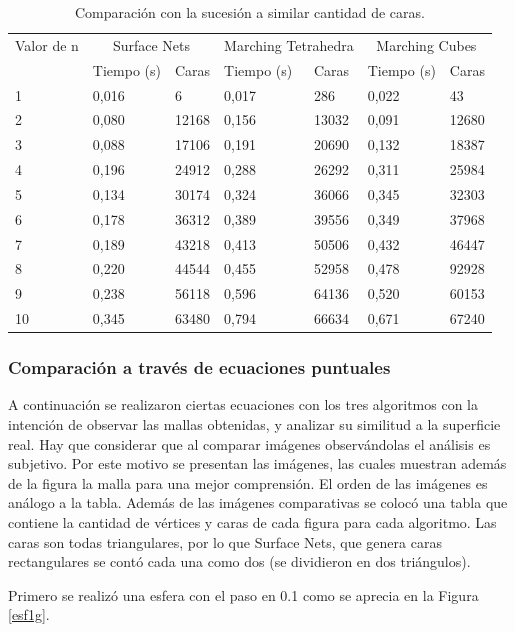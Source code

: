 \documentclass[12pt]{article}
\begin{document}
\begin{table}[h!]
  \centering
\begin{tabular}{lllllll}
\toprule 
    Valor de n & \multicolumn{2}{c}{Surface Nets} & \multicolumn{2}{c}{Marching Tetrahedra}  & \multicolumn{2}{c}{Marching Cubes}\\
    &Tiempo (s) &Caras
    &Tiempo (s) &Caras
    &Tiempo (s) &Caras \\
    \midrule
    1 & 0,016 &6 & 0,017 &286 & 0,022 &43\\
    2 & 0,080 &12168 & 0,156 &13032 & 0,091 &12680\\
    3 & 0,088 &17106 & 0,191 &20690 & 0,132 &18387\\
    4 & 0,196 &24912 & 0,288 &26292 & 0,311 &25984\\
    5 & 0,134 &30174 & 0,324 &36066 & 0,345 &32303\\
    6 & 0,178 &36312 & 0,389 &39556 & 0,349 &37968\\
    7 & 0,189 &43218 & 0,413 &50506 & 0,432 &46447\\
    8 & 0,220 &44544 & 0,455 &52958 & 0,478 &92928\\
    9 & 0,238 &56118 & 0,596 &64136 & 0,520 &60153\\
    10 & 0,345 &63480 & 0,794 &66634 & 0,671 &67240\\
    \bottomrule
\end{tabular}
  \caption{Comparación con la sucesión a similar cantidad de caras.}
  \label{tablaSIC}
\end{table}

\subsubsection{Comparación a través de ecuaciones puntuales}
\noindent A continuación se realizaron ciertas ecuaciones con los tres algoritmos con la intención de observar las mallas obtenidas, y analizar su similitud a la superficie real. Hay que considerar que al comparar imágenes observándolas el análisis es subjetivo. Por este motivo se presentan las imágenes, las cuales muestran además de la figura la malla para una mejor comprensión. El orden de las imágenes es análogo a la tabla. Además de las imágenes comparativas se colocó una tabla que contiene la cantidad de vértices y caras de cada figura para cada algoritmo. Las caras son todas triangulares, por lo que Surface Nets, que genera caras rectangulares se contó cada una como dos (se dividieron en dos triángulos).

Primero se realizó una esfera con el paso en 0.1 como se aprecia en la Figura \ref{esf1g}.
\end{document}
